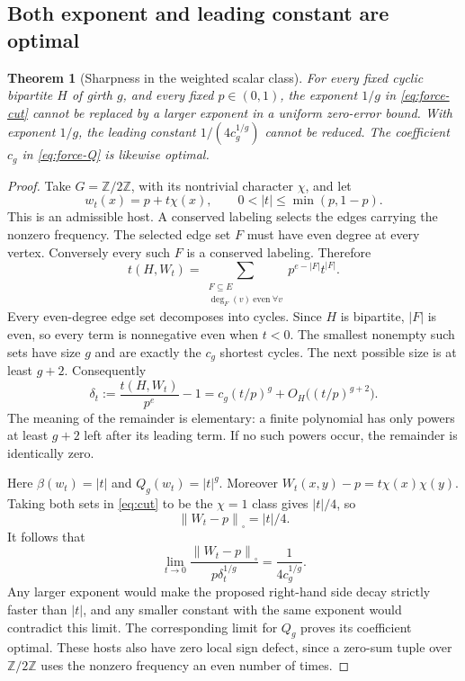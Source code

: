 \documentclass[11pt]{article}
\numberwithin{equation}{section}
\newtheorem{theorem}{Theorem}[section]
\theoremstyle{definition}
\theoremstyle{remark}
\newcommand{\Z}{\mathbb Z}
\newcommand{\Cut}[1]{\left\|#1\right\|_{\square}}
\begin{document}
\subsection{Both exponent and leading constant are optimal}

\begin{theorem}[Sharpness in the weighted scalar class]
\label{thm:sharp}
For every fixed cyclic bipartite $H$ of girth $g$, and every fixed
$p\in(0,1)$, the exponent $1/g$ in \eqref{eq:force-cut} cannot be
replaced by a larger exponent in a uniform zero-error bound. With
exponent $1/g$, the leading constant $1/(4c_g^{1/g})$ cannot be
reduced. The coefficient $c_g$ in \eqref{eq:force-Q} is likewise
optimal.
\end{theorem}
\begin{proof}
Take $G=\Z/2\Z$, with its nontrivial character $\chi$, and let
\begin{equation}
 w_t(x)=p+t\chi(x),\qquad
 0<|t|\leq\min(p,1-p).
 \label{eq:rank-one}
\end{equation}
This is an admissible host. A conserved labeling selects the edges
carrying the nonzero frequency. The selected edge set $F$ must have
even degree at every vertex. Conversely every such $F$ is a conserved
labeling. Therefore
\begin{equation}
 t(H,W_t)=\sum_{\substack{F\subseteq E\\
                         \deg_F(v)\ \mathrm{even}\ \forall v}}
                  p^{e-|F|}t^{|F|}.
 \label{eq:even-subgraph}
\end{equation}
Every even-degree edge set decomposes into cycles. Since $H$ is
bipartite, $|F|$ is even, so every term is nonnegative even when $t<0$.
The smallest nonempty such sets have size $g$ and are exactly the
$c_g$ shortest cycles. The next possible size is at least $g+2$.
Consequently
\begin{equation}
 \delta_t:=\frac{t(H,W_t)}{p^e}-1
   =c_g(t/p)^g+O_H\bigl((t/p)^{g+2}\bigr).
 \label{eq:sharp-asymptotic}
\end{equation}
The meaning of the remainder is elementary: a finite polynomial has
only powers at least $g+2$ left after its leading term. If no such powers
occur, the remainder is identically zero.

Here $\beta(w_t)=|t|$ and $Q_g(w_t)=|t|^g$. Moreover
$W_t(x,y)-p=t\chi(x)\chi(y)$. Taking both sets in \eqref{eq:cut} to
be the $\chi=1$ class gives $|t|/4$, so
\begin{equation}
 \Cut{W_t-p}=|t|/4.
 \label{eq:exact-rank-one-cut}
\end{equation}
It follows that
\begin{equation}
 \lim_{t\to0}
 \frac{\Cut{W_t-p}}{p\delta_t^{1/g}}
      =\frac1{4c_g^{1/g}}.
 \label{eq:sharp-limit}
\end{equation}
Any larger exponent would make the proposed right-hand side decay
strictly faster than $|t|$, and any smaller constant with the same
exponent would contradict this limit. The corresponding limit for
$Q_g$ proves its coefficient optimal. These hosts also have zero local
sign defect, since a zero-sum tuple over $\Z/2\Z$ uses the nonzero
frequency an even number of times.
\end{proof}
\end{document}
